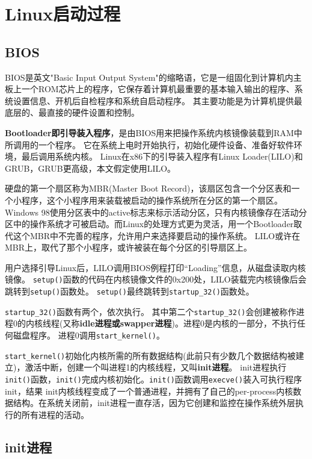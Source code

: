 \section{Linux启动过程}


\subsection{BIOS}
BIOS是英文"Basic Input Output System"的缩略语，它是一组固化到计算机内主板上一个ROM芯片上的程序，它保存着计算机最重要的基本输入输出的程序、系统设置信息、开机后自检程序和系统自启动程序。 其主要功能是为计算机提供最底层的、最直接的硬件设置和控制。

\textbf{Bootloader即引导装入程序}，是由BIOS用来把操作系统内核镜像装载到RAM中所调用的一个程序。
它在系统上电时开始执行，初始化硬件设备、准备好软件环境，最后调用系统内核。
Linux在x86下的引导装入程序有Linux Loader(LILO)和GRUB，GRUB更高级，本文假定使用LILO。

硬盘的第一个扇区称为MBR(Master Boot Record)，该扇区包含一个分区表和一个小程序，这个小程序用来装载被启动的操作系统所在分区的第一个扇区。Windows 98使用分区表中的active标志来标示活动分区，只有内核镜像存在活动分区中的操作系统才可被启动。而Linux的处理方式更为灵活，用一个Bootloader取代这个MBR中不完善的程序，允许用户来选择要启动的操作系统。
LILO或许在MBR上，取代了那个小程序，或许被装在每个分区的引导扇区上。

用户选择引导Linux后，LILO调用BIOS例程打印“Loading”信息，从磁盘读取内核镜像。
\verb$setup()$函数的代码在内核镜像文件的0x200处，LILO装载完内核镜像后会跳转到\verb$setup()$函数处。
\verb$setup()$最终跳转到\verb$startup_32()$函数处。

\verb$startup_32()$函数有两个，依次执行。
其中第二个\verb$startup_32()$会创建被称作进程0的内核线程(又称\textbf{idle进程或swapper进程})。进程0是内核的一部分，不执行任何磁盘程序。
进程0调用\verb$start_kernel()$。

\verb$start_kernel()$初始化内核所需的所有数据结构(此前只有少数几个数据结构被建立)，激活中断，创建一个叫进程1的内核线程，又叫\textbf{init进程}。
init进程执行\verb$init()$函数，\verb$init()$完成内核初始化。\verb$init()$函数调用\verb$execve()$装入可执行程序init，结果
init内核线程变成了一个普通进程，并拥有了自己的per-process内核数据结构。在系统关闭前，init进程一直存活，因为它创建和监控在操作系统外层执行的所有进程的活动。

\subsection{init进程}

